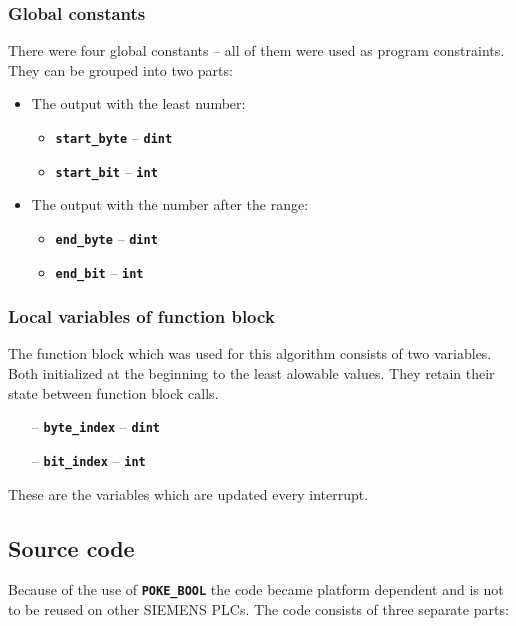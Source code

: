 \documentclass[a4paper, 12pt, titlepage]{article}
\begin{document}
            \subsubsection{Global constants}
                There were four global constants -- all of them were used as
                program constraints. They can be grouped into two parts:
                \begin{itemize}
                    \item The output with the least number:
                        \begin{itemize}
                            \item \textbf{\texttt{start\_byte}} -- \textbf{\texttt{dint}}
                            \item \textbf{\texttt{start\_bit}} -- \textbf{\texttt{int}}
                        \end{itemize}
                    \item The output with the number after the range:
                        \begin{itemize}
                            \item \textbf{\texttt{end\_byte}} -- \textbf{\texttt{dint}} 
                            \item \textbf{\texttt{end\_bit}} -- \textbf{\texttt{int}}
                        \end{itemize}
                \end{itemize}
            \subsubsection{Local variables of function block}
                The function block which was used for this algorithm consists of two
                variables. Both initialized at the beginning to the least alowable
                values. They retain their state between function block calls.
                \begin{itemize}
                    \item[--] \textbf{\texttt{byte\_index}} -- \textbf{\texttt{dint}} 
                    \item[--] \textbf{\texttt{bit\_index}} -- \textbf{\texttt{int}} 
                \end{itemize}
                These are the variables which are updated every interrupt.
        \subsection{Source code}
            Because of the use of \texttt{\textbf{POKE\_BOOL}} the code became platform
            dependent and is not to be reused on other SIEMENS PLCs. The code consists of
            three separate parts:
\end{document}
